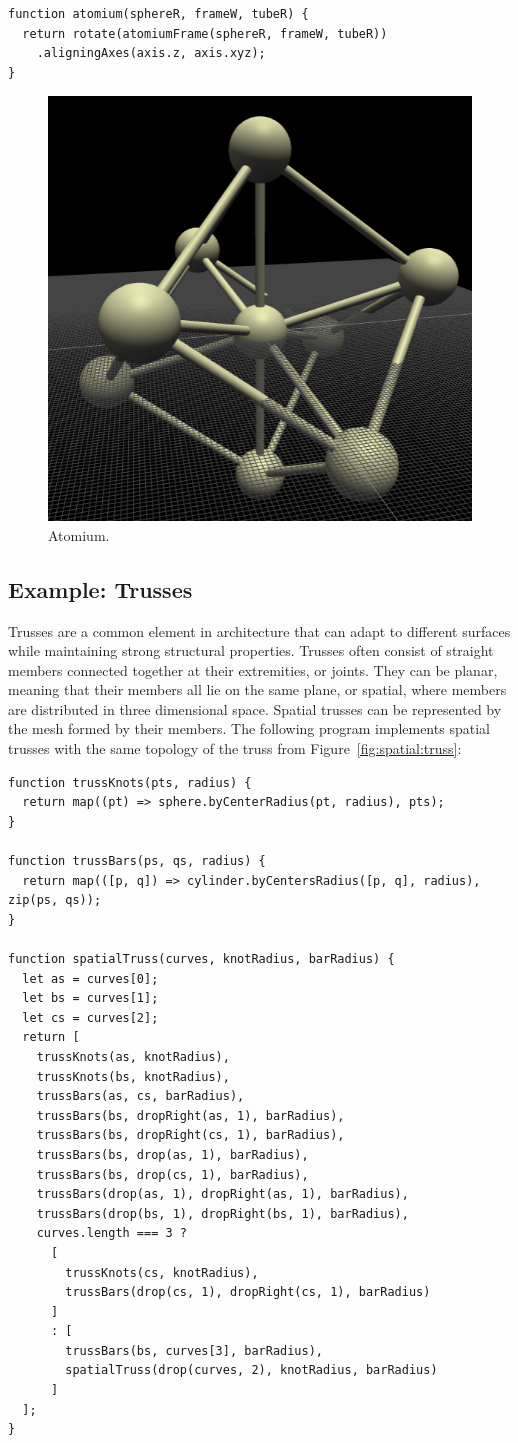 \begin{verbatim}
function atomium(sphereR, frameW, tubeR) {
  return rotate(atomiumFrame(sphereR, frameW, tubeR))
    .aligningAxes(axis.z, axis.xyz);
}
\end{verbatim}

\begin{figure}
  \centering
  \includegraphics[width=0.5\linewidth]{./images/detail_examples/atomium_2_crop}
  \caption{Atomium.}
  \label{fig:ex:atomium}
\end{figure}


\subsection{Example: Trusses}
Trusses are a common element in architecture that can adapt to different surfaces while maintaining strong structural properties.
Trusses often consist of straight members connected together at their extremities, or joints.
They can be planar, meaning that their members all lie on the same plane, or spatial, where members are distributed in three dimensional space.
Spatial trusses can be represented by the mesh formed by their members.
The following program implements spatial trusses with the same topology of the truss from Figure~\ref{fig:spatial:truss}:

\begin{verbatim}
function trussKnots(pts, radius) {
  return map((pt) => sphere.byCenterRadius(pt, radius), pts);
}

function trussBars(ps, qs, radius) {
  return map(([p, q]) => cylinder.byCentersRadius([p, q], radius), zip(ps, qs));
}

function spatialTruss(curves, knotRadius, barRadius) {
  let as = curves[0];
  let bs = curves[1];
  let cs = curves[2];
  return [
    trussKnots(as, knotRadius),
    trussKnots(bs, knotRadius),
    trussBars(as, cs, barRadius),
    trussBars(bs, dropRight(as, 1), barRadius),
    trussBars(bs, dropRight(cs, 1), barRadius),
    trussBars(bs, drop(as, 1), barRadius),
    trussBars(bs, drop(cs, 1), barRadius),
    trussBars(drop(as, 1), dropRight(as, 1), barRadius),
    trussBars(drop(bs, 1), dropRight(bs, 1), barRadius),
    curves.length === 3 ?
      [
        trussKnots(cs, knotRadius),
        trussBars(drop(cs, 1), dropRight(cs, 1), barRadius)
      ]
      : [
        trussBars(bs, curves[3], barRadius),
        spatialTruss(drop(curves, 2), knotRadius, barRadius)
      ]
  ];
}
\end{verbatim}

